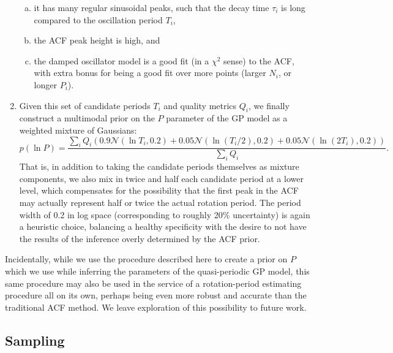 \documentclass[useAMS, usenatbib, preprint, 12pt]{aastex}
\begin{document}
\begin{enumerate}
{\begin{enumerate}[(a)]
    \item{it has many regular sinusoidal peaks, such that the decay
        time $\tau_i$ is long compared to the oscillation period $T_i$,}
    \item{the ACF peak height is high, and}
    \item{the damped oscillator model is a good fit (in a $\chi^2$
      sense) to the ACF, with extra bonus for being
      a good fit over more points (larger $N_i$, or longer $P_i$).}

    \end{enumerate}
}

\item{Given this set of candidate periods $T_i$ and quality metrics $Q_i$,
we finally construct a multimodal prior on the $P$ parameter of the GP
model as a weighted mixture of Gaussians:
\begin{equation}
\label{eq:mixture}
p(\ln P) = \frac {\displaystyle \sum_i Q_i \left(0.9\mathcal N(\ln T_i, 0.2) +
                                          0.05\mathcal N(\ln (T_i/2), 0.2) +
                                          0.05\mathcal N(\ln (2 T_i), 0.2) \right)}
                {\sum_i Q_i}.
\end{equation}
That is, in addition to taking the candidate periods themselves as mixture
components, we also mix in twice and half each candidate period at a lower level,
which compensates for the possibility that the first peak in the ACF may actually
represent half or twice the actual rotation period.  The period width of 0.2 in
log space (corresponding to roughly 20\% uncertainty) is again a heuristic choice,
balancing a healthy specificity with the desire to not have the results of
the inference overly determined by the ACF prior.
}
\end{enumerate}

Incidentally, while we use the procedure described here to create a prior on
$P$ which we use while inferring the parameters of the quasi-periodic GP model,
this same procedure may also be used in the service of a
rotation-period estimating procedure all on its own, perhaps being even more
robust and accurate than the traditional ACF method.  We leave exploration of
this possibility to future work.

\subsection{Sampling}
\label{sec:sampling}
\end{document}
